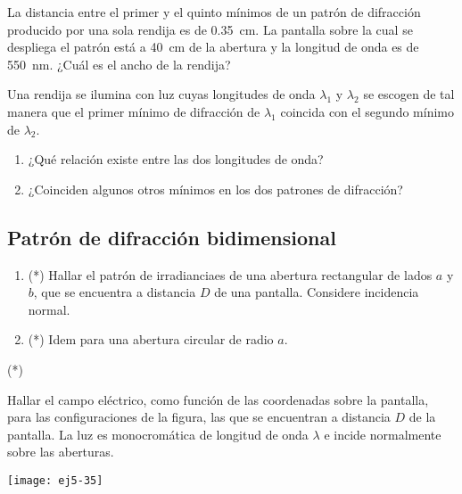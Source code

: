 \item La distancia entre el primer y el quinto mínimos de un patrón de difracción producido por una sola rendija es de \SI{0.35}{\centi\metre}.
La pantalla sobre la cual se despliega el patrón está a \SI{40}{\centi\metre} de la abertura y la longitud de onda es de \SI{550}{\nano\metre}.
¿Cuál es el ancho de la rendija?



\item Una rendija se ilumina con luz cuyas longitudes de onda \(\lambda_1\) y \(\lambda_2\) se escogen de tal manera que el primer mínimo de difracción de \(\lambda_1\) coincida con el segundo mínimo de \(\lambda_2\).
\begin{enumerate}
	\item ¿Qué relación existe entre las dos longitudes de onda?
	\item ¿Coinciden algunos otros mínimos en los dos patrones de difracción?
\end{enumerate}



\subsection*{Patrón de difracción bidimensional}

\item
\begin{enumerate}
	\item (*) Hallar el patrón de irradianciaes de una abertura rectangular de lados $a$ y $b$, que se encuentra a distancia $D$ de una pantalla.
	Considere incidencia normal. 
	\item (*) Idem para una abertura circular de radio $a$.
\end{enumerate}



\item (*)
\begin{minipage}[t][2.5cm]{0.6\textwidth}
Hallar el campo eléctrico, como función de las coordenadas sobre la pantalla, para las configuraciones de la figura, las que se encuentran a distancia $D$ de la pantalla.
La luz es monocromática de longitud de onda $\lambda$ e incide normalmente sobre las aberturas. 
\end{minipage}
\begin{minipage}[c][2.5cm][t]{0.3\textwidth}
	\texttt{[image: ej5-35]}
\end{minipage}
